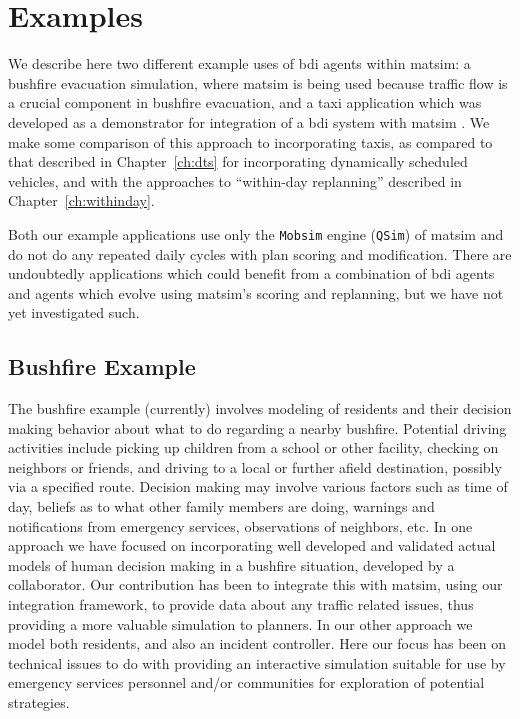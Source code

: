 \section{Examples}
\label{sec:bid-examples}
We describe here two different example uses of \gls{bdi} agents within
\gls{matsim}: a bushfire evacuation simulation, where \gls{matsim} is
being used because traffic flow is a crucial component in bushfire
evacuation, and a taxi application which was developed as a
demonstrator for integration of a \gls{bdi} system with \gls{matsim} \cite{ecai}. We make
some comparison of this approach to incorporating taxis, as compared to
that described in Chapter~\ref{ch:dts} for
incorporating dynamically scheduled vehicles, and with the approaches
to ``within-day replanning'' described in Chapter~\ref{ch:withinday}.

%
Both our example applications use only the \lstinline{Mobsim} engine
(\lstinline{QSim}) of \gls{matsim} and do not do any repeated daily cycles
with plan scoring and modification. There are undoubtedly applications which
could benefit from a combination of \gls{bdi} agents and agents which evolve using
\gls{matsim}'s scoring and replanning, but we have not yet investigated such.

\subsection{Bushfire Example}
The bushfire example (currently) involves modeling of residents and
their decision making behavior about what to do regarding a nearby
bushfire. Potential driving activities include picking up children
from a school or other facility, checking on neighbors or friends,
and driving to a local or further afield destination, possibly via a
specified route. Decision making may involve various factors such as
time of day, beliefs as to what other family members are doing,
warnings and notifications from emergency services, observations of
neighbors, etc. In one approach we have focused on incorporating
well developed and validated actual models of human decision making in
a bushfire situation, developed by a collaborator. Our contribution
has been to integrate this with \gls{matsim}, using our integration
framework, to provide data about any traffic related issues, thus
providing a more valuable simulation to planners. In our other
approach we model both residents, and also an incident
controller. Here our focus has been on technical issues to do with
providing an interactive simulation suitable for use by emergency
services personnel and/or communities for exploration of potential
strategies. 

